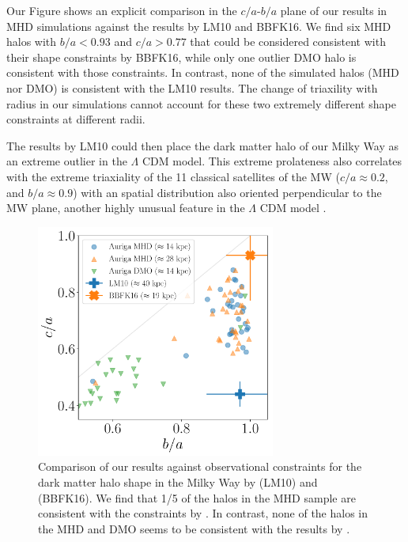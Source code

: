 \documentclass[usenatbib]{mnras}
\begin{document}
Our Figure \label{fig:observations} shows an explicit comparison in
the $c/a$-$b/a$ plane of our results in MHD simulations against the
results by LM10 and BBFK16.  
We find six MHD halos with $b/a<0.93$ and $c/a>0.77$ that could be
considered consistent with their shape constraints  by BBFK16, while
only one outlier DMO halo is consistent with those constraints.
In contrast, none of the simulated halos (MHD nor DMO) is consistent
with the LM10 results. 
The change of triaxility with radius in our simulations cannot account
for these two extremely different shape constraints at different
radii. 


The results by LM10 could then place the dark matter halo of our Milky
Way as an extreme outlier in the $\Lambda$ CDM model. 
This extreme prolateness also correlates with the extreme
triaxiality of the 11 classical satellites of the MW ($c/a\approx
0.2$, and $b/a\approx0.9$) with an spatial distribution 
also oriented perpendicular to the MW plane, another highly unusual
feature in the $\Lambda$ CDM model \citep{2018MNRAS.478.5533F}.



\begin{figure}
\begin{center}
\includegraphics[width=0.7\textwidth]{triaxiality_observations.pdf}
\end{center}
\caption{Comparison of our results against 
observational constraints for the 
dark matter halo shape in the Milky Way by \citet{LM10} (LM10) and
\citet{Bovy16} (BBFK16).   
We find that  1/5 of the halos in the MHD  sample are consistent with
the constraints by \citet{Bovy16}.
In contrast, none of the halos in the MHD and DMO seems to be
consistent with the results by \citet{LM10}.}
\label{fig:observations}
\end{figure}
\end{document}
